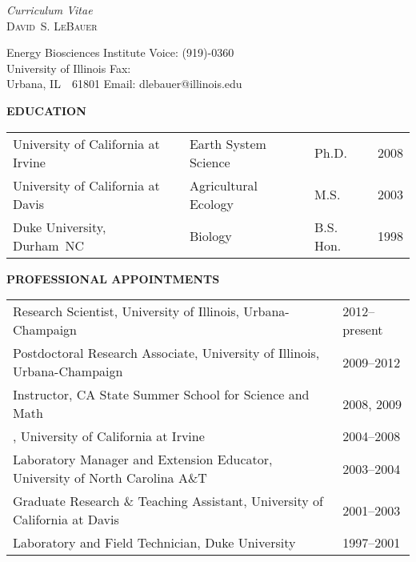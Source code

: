\documentclass[10pt,twoside]{article}
\begin{document}
\setcounter{page}{1}
\pagestyle{fancy}
\chead{}
\rhead{\thepage}
\lfoot{}
\cfoot{}
\rfoot{}
\newcommand{\dslnote}{\csznote}
\thispagestyle{plain}

\begin{center}
{\textit{Curriculum Vitae}}\\
{\large\textsc{David~S. LeBauer}}\\
\end{center}

Energy Biosciences Institute \hfill Voice: (919)-0360\\
University of Illinois \hfill Fax:   \\
Urbana, IL~~61801 \hfill Email: dlebauer@illinois.edu\\

\bigskip\bigskip

\textbf{EDUCATION}
\begin{table}[h]
\begin{tabular}{ l l l l } 
University of California at Irvine & Earth System Science & Ph.D. & 2008\\
University of California at Davis & Agricultural Ecology & M.S. & 2003 \\
Duke University, Durham~NC & Biology & B.S. Hon. & 1998 \\
\end{tabular}
\end{table}


\textbf{PROFESSIONAL APPOINTMENTS}
\begin{table}[h]
\begin{tabular}{>{\raggedright}p{35.0em}<{} l }
  Research Scientist, University of Illinois, Urbana-Champaign &2012--present \\ 
  Postdoctoral Research Associate, University of Illinois, Urbana-Champaign &2009--2012 \\ 
  Instructor, CA State Summer School for Science and Math & 2008, 2009\\
  , University of California at Irvine & 2004--2008\\ 
  Laboratory Manager and Extension Educator, University of North Carolina A\&T & 2003--2004\\
  Graduate Research \& Teaching Assistant, University of California at Davis &2001--2003 \\
  Laboratory and Field Technician, Duke University & 1997--2001 \\
\end{tabular}
\end{table}
\end{document}
